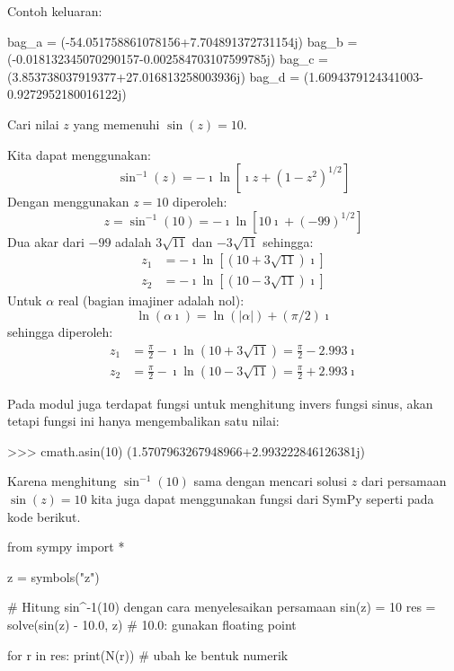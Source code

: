 Contoh keluaran:
\begin{textcode}
bag_a =  (-54.051758861078156+7.704891372731154j)
bag_b =  (-0.018132345070290157-0.002584703107599785j)
bag_c =  (3.853738037919377+27.016813258003936j)
bag_d =  (1.6094379124341003-0.9272952180016122j)
\end{textcode}


\begin{contoh}
Cari nilai $z$ yang memenuhi $\sin(z) = 10$.

Kita dapat menggunakan:
\begin{equation*}
\sin^{-1}(z) = -\imath \ln\left[\imath z+\left(1-z^{2}\right)^{1/2}\right]
\end{equation*}
Dengan menggunakan $z = 10$ diperoleh:
\begin{equation*}
z = \sin^{-1}(10) = -\imath \ln \left[ 10\imath + (-99)^{1/2} \right]
\end{equation*}
Dua akar dari $-99$ adalah $3\sqrt{11}$ dan $-3\sqrt{11}$ sehingga:
\begin{align*}
z_1 & = -\imath \ln\left[ (10 + 3\sqrt{11})\imath \right] \\
z_2 & = -\imath \ln\left[ (10 - 3\sqrt{11})\imath \right]
\end{align*}
Untuk $\alpha$ real (bagian imajiner adalah nol):
\begin{equation*}
\ln(\alpha \imath) = \ln(|\alpha|) + (\pi/2)\imath
\end{equation*}
sehingga diperoleh:
\begin{align*}
z_1 & = \frac{\pi}{2} - \imath \ln(10 + 3\sqrt{11}) = \frac{\pi}{2} - 2.993\imath \\
z_2 & = \frac{\pi}{2} - \imath \ln(10 - 3\sqrt{11}) = \frac{\pi}{2} + 2.993\imath
\end{align*}

\end{contoh}

Pada modul  juga terdapat fungsi  untuk menghitung
invers fungsi sinus, akan tetapi fungsi ini hanya mengembalikan satu nilai:
\begin{pyconcode}
>>> cmath.asin(10)
(1.5707963267948966+2.993222846126381j)
\end{pyconcode}

Karena menghitung $\sin^{-1}(10)$ sama dengan mencari solusi $z$ dari persamaan
$\sin(z) = 10$ kita juga dapat menggunakan fungsi  dari SymPy
seperti pada kode berikut.
\begin{pythoncode}
from sympy import *

z = symbols("z")

# Hitung sin^{-1}(10) dengan cara menyelesaikan persamaan sin(z) = 10
res = solve(sin(z) - 10.0, z)
# 10.0: gunakan floating point

for r in res:
    print(N(r)) # ubah ke bentuk numerik
\end{pythoncode}

